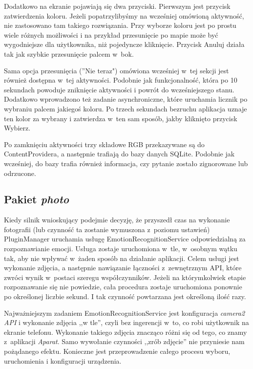 Dodatkowo na ekranie pojawiają się dwa przyciski. Pierwszym jest przycisk zatwierdzenia koloru. Jeżeli popatrzylibyśmy na wcześniej omówioną aktywność, nie zastosowano tam takiego rozwiązania. Przy wyborze koloru jest po prostu wiele różnych możliwości i na przykład przesunięcie po mapie może być wygodniejsze dla użytkownika, niż pojedyncze kliknięcie. Przycisk Anuluj działa tak jak szybkie przesunięcie palcem w~bok.

Sama opcja przesunięcia (''Nie teraz") omówiona wcześniej w~tej sekcji jest również dostępna w~tej aktywności. Podobnie jak funkcjonalność, która po 10 sekundach powoduje zniknięcie aktywności i powrót do wcześniejszego stanu. Dodatkowo wprowadzono też zadanie asynchroniczne, które uruchamia licznik po wybraniu palcem jakiegoś koloru. Po trzech sekundach bezruchu aplikacja uznaje ten kolor za wybrany i zatwierdza w~ten sam sposób, jakby kliknięto przycisk Wybierz.

Po zamknięciu aktywności trzy składowe RGB przekazywane są do ContentProvidera, a następnie trafiają do bazy danych SQLite. Podobnie jak wcześniej, do bazy trafia również informacja, czy pytanie zostało zignorowane lub odrzucone.


\subsection{Pakiet \textit{photo}}

Kiedy silnik wnioskujący podejmie decyzję, że przyszedł czas na wykonanie fotografii (lub czynność ta zostanie wymuszona z~poziomu ustawień) PluginManager uruchamia usługę EmotionRecognitionService odpowiedzialną za rozpoznawianie emocji. Usługa zostaje uruchomiona w~tle, w~osobnym wątku tak, aby nie wpływać w~żaden sposób na działanie aplikacji. Celem usługi jest wykonanie zdjęcia, a następnie nawiązanie łączności z~zewnętrznym API, które zwróci wynik w~postaci szeregu współczynników. Jeżeli na którymkolwiek etapie rozpoznawanie się nie powiedzie, cała procedura zostaje uruchomiona ponownie po określonej liczbie sekund. I tak czynność powtarzana jest określoną ilość razy.

Najważniejszym zadaniem EmotionRecognitionService jest konfiguracja \textit{camera2 API} i wykonanie zdjęcia ,,w tle'', czyli bez ingerencji w~to, co robi użytkownik na ekranie telefonu. Wykonanie takiego zdjęcia znacząco różni się od tego, co znamy z~aplikacji \textit{Aparat}. Samo wywołanie czynności ,,zrób zdjęcie'' nie przyniesie nam pożądanego efektu. Konieczne jest przeprowadzenie całego procesu wyboru, uruchomienia i konfiguracji urządzenia. 

